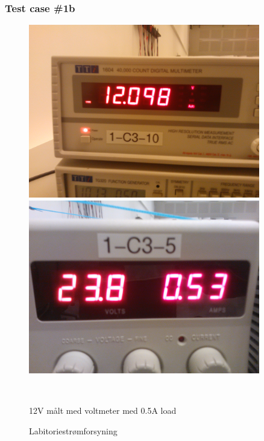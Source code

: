 \subsubsection{Test case \#1b}
\begin{figure}[htbp] \centering
\begin{minipage}[c]{0.48\textwidth} \centering
\includegraphics[width=0.9\textwidth]{billeder/12V_05A_meter.jpg} 
\end{minipage} \hfill
\begin{minipage}[c]{0.48\textwidth} \centering
\includegraphics[width=0.9\textwidth]{billeder/12V_05A_power.jpg} 
\end{minipage} \\ 
\begin{minipage}[t]{0.48\textwidth}
\caption{12V målt med voltmeter med 0.5A load} 
\label{fig:udgang_12V_05A}
\end{minipage} \hfill
\begin{minipage}[t]{0.48\textwidth}
\caption{Labitoriestrømforsyning} 
\label{fig:forsyning_12V_05A_lab}
\end{minipage}
\end{figure}
